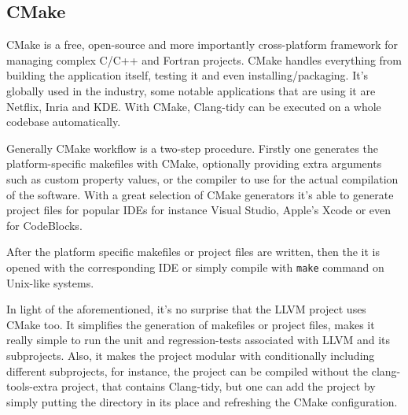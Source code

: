\subsection{CMake}
\par CMake is a free, open-source and more importantly cross-platform framework for managing complex C/C++ and Fortran projects. CMake handles everything from building the application itself, testing it and even installing/packaging. It's globally used in the industry, some notable applications that are using it are Netflix, Inria and KDE\cite{cmake_homepage}. With CMake, Clang-tidy can be executed on a whole codebase automatically. \medskip
\par Generally CMake workflow is a two-step procedure. Firstly one generates the platform-specific makefiles with CMake, optionally providing extra arguments such as custom property values, or the compiler to use for the actual compilation of the software. With a great selection of CMake generators it's able to generate project files for popular IDEs for instance Visual Studio, Apple's Xcode or even for CodeBlocks\cite{cmake_generator_doc}. \medskip
\par After the platform specific makefiles or project files are written, then the it is opened with the corresponding IDE or simply compile with \verb|make| command on Unix-like systems. \medskip
\par In light of the aforementioned, it's no surprise that the LLVM project uses CMake too. It simplifies the generation of makefiles or project files, makes it really simple to run the unit and regression-tests associated with LLVM and its subprojects. Also, it makes the project modular with conditionally including different subprojects, for instance, the project can be compiled without the clang-tools-extra project, that contains Clang-tidy, but one can add the project by simply putting the directory in its place and refreshing the CMake configuration.
